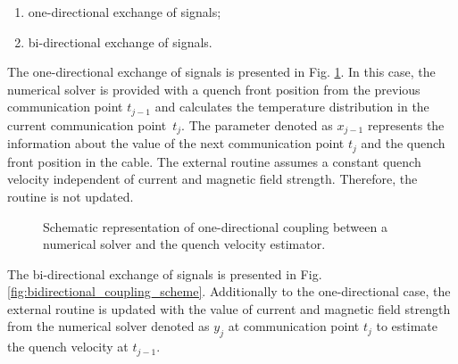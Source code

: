 \begin{enumerate}
    \item one-directional exchange of signals;
    \item bi-directional exchange of signals.
\end{enumerate}

The one-directional exchange of signals is presented in Fig. \ref{fig:unidirectional_coupling_scheme}. In this case, the numerical solver is provided with a quench front position from the previous communication point $t_{j-1}$ and calculates the temperature distribution in the current communication point~$t_j$. The parameter denoted as $x_{j-1}$ represents the information about the value of the next communication point $t_j$ and the quench front position in the cable. The external routine assumes a constant quench velocity independent of current and magnetic field strength. Therefore, the routine is not updated.

\begin{figure}[H]
\centering
{}
\caption{Schematic representation of one-directional coupling between a numerical solver and the quench velocity estimator.}
\label{fig:unidirectional_coupling_scheme}
\end{figure}

The bi-directional exchange of signals is presented in Fig. \ref{fig:bidirectional_coupling_scheme}.
Additionally to the one-directional case, the external routine is updated with the value of current and magnetic field strength from the numerical solver denoted as $y_j$ at communication point $t_j$ to estimate the quench velocity at $t_{j-1}$.


